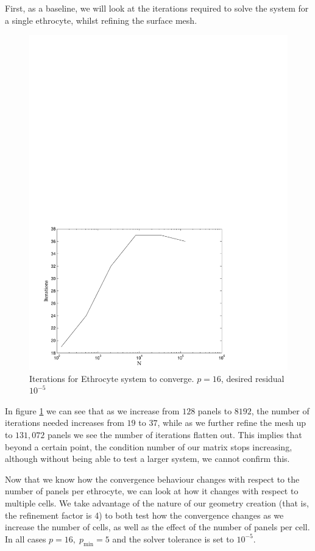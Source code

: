 First, as a baseline, we will look at the iterations required to solve the system for a single ethrocyte, whilst refining the surface mesh.

\begin{figure}
\begin{center}
	\includegraphics[width=12cm]{img/StokesSingleCellIterations.pdf}
	\caption{Iterations for Ethrocyte system to converge. $p = 16$, desired residual $10^{-5}$}
	\label{fig:single_cell_iterations}
\end{center}
\end{figure}

In figure \ref{fig:single_cell_iterations} we can see that as we increase from $128$ panels to $8192$, the number of iterations needed increases from $19$ to $37$, while as we further refine the mesh up to $131,072$ panels we see the number of iterations flatten out. This implies that beyond a certain point, the condition number of our matrix stops increasing, although without being able to test a larger system, we cannot confirm this. %

Now that we know how the convergence behaviour changes with respect to the number of panels per ethrocyte, we can look at how it changes with respect to multiple cells. We take advantage of the nature of our geometry creation (that is, the refinement factor is 4) to both test how the convergence changes as we increase the number of cells, as well as the effect of the number of panels per cell. In all cases $p = 16,\;p_{\text{min}} = 5$ and the solver tolerance is set to $10^{-5}$.

